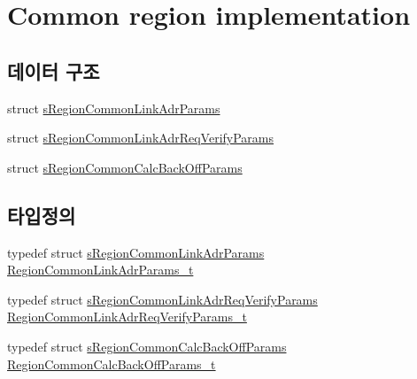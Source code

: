 \hypertarget{group___r_e_g_i_o_n_c_o_m_m_o_n}{}\section{Common region implementation}
\label{group___r_e_g_i_o_n_c_o_m_m_o_n}
\subsection*{데이터 구조}
\begin{DoxyCompactItemize}
\item 
struct \mbox{\hyperlink{structs_region_common_link_adr_params}{s\+Region\+Common\+Link\+Adr\+Params}}
\item 
struct \mbox{\hyperlink{structs_region_common_link_adr_req_verify_params}{s\+Region\+Common\+Link\+Adr\+Req\+Verify\+Params}}
\item 
struct \mbox{\hyperlink{structs_region_common_calc_back_off_params}{s\+Region\+Common\+Calc\+Back\+Off\+Params}}
\end{DoxyCompactItemize}
\subsection*{타입정의}
\begin{DoxyCompactItemize}
\item 
typedef struct \mbox{\hyperlink{structs_region_common_link_adr_params}{s\+Region\+Common\+Link\+Adr\+Params}} \mbox{\hyperlink{group___r_e_g_i_o_n_c_o_m_m_o_n_ga6e1aaa6b8d179e2daffac8d1e23d7f24}{Region\+Common\+Link\+Adr\+Params\+\_\+t}}
\item 
typedef struct \mbox{\hyperlink{structs_region_common_link_adr_req_verify_params}{s\+Region\+Common\+Link\+Adr\+Req\+Verify\+Params}} \mbox{\hyperlink{group___r_e_g_i_o_n_c_o_m_m_o_n_gad186afbaf1b52893ddc3fa5eba88de0a}{Region\+Common\+Link\+Adr\+Req\+Verify\+Params\+\_\+t}}
\item 
typedef struct \mbox{\hyperlink{structs_region_common_calc_back_off_params}{s\+Region\+Common\+Calc\+Back\+Off\+Params}} \mbox{\hyperlink{group___r_e_g_i_o_n_c_o_m_m_o_n_ga26c2fc7c3e1d929d59b5653a5cd1fc0c}{Region\+Common\+Calc\+Back\+Off\+Params\+\_\+t}}
\end{DoxyCompactItemize}
